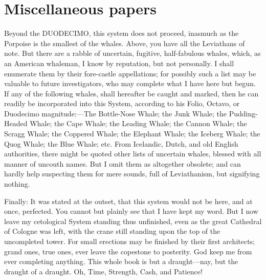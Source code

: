 \section{Miscellaneous papers}

Beyond the DUODECIMO, this system does not proceed, inasmuch as the Porpoise is the smallest of the whales. Above, you have all the Leviathans of note. But there are a rabble of uncertain, fugitive, half-fabulous whales, which, as an American whaleman, I know by reputation, but not personally. I shall enumerate them by their fore-castle appellations; for possibly such a list may be valuable to future investigators, who may complete what I have here but begun. If any of the following whales, shall hereafter be caught and marked, then he can readily be incorporated into this System, according to his Folio, Octavo, or Duodecimo magnitude:---The Bottle-Nose Whale; the Junk Whale; the Pudding-Headed Whale; the Cape Whale; the Leading Whale; the Cannon Whale; the Scragg Whale; the Coppered Whale; the Elephant Whale; the Iceberg Whale; the Quog Whale; the Blue Whale; etc. From Icelandic, Dutch, and old English authorities, there might be quoted other lists of uncertain whales, blessed with all manner of uncouth names. But I omit them as altogether obsolete; and can hardly help suspecting them for mere sounds, full of Leviathanism, but signifying nothing.

Finally: It was stated at the outset, that this system would not be here, and at once, perfected. You cannot but plainly see that I have kept my word. But I now leave my cetological System standing thus unfinished, even as the great Cathedral of Cologne was left, with the crane still standing upon the top of the uncompleted tower. For small erections may be finished by their first architects; grand ones, true ones, ever leave the copestone to posterity. God keep me from ever completing anything. This whole book is but a draught---nay, but the draught of a draught. Oh, Time, Strength, Cash, and Patience!






%
% 



\begin{thebibliography}{99}



\end{thebibliography}
